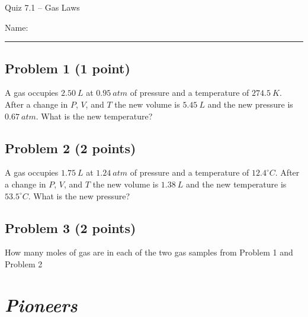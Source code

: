 \documentclass[11pt, letterpaper]{memoir}
\begin{document}
	\begin{center}
		{\large	Quiz 7.1 -- Gas Laws}
	\end{center}
{\large Name: \rule[-1mm]{4in}{.1pt}
	
	\subsection*{Problem 1 (1 point)}
	A gas occupies $2.50~L$ at $0.95~atm$ of pressure and a temperature of $274.5~K$. After a change in $P$, $V$, and $T$ the new volume is $5.45~L$ and the new pressure is $0.67~atm$. What is the new temperature?
	
	\vspace{10em}
	\subsection*{Problem 2 (2 points)}
	A gas occupies $1.75~L$ at $1.24~atm$ of pressure and a temperature of $12.4^\circ C$. After a change in $P$, $V$, and $T$ the new volume is $1.38~L$ and the new temperature is $53.5^\circ C$. What is the new pressure?
	
	\vspace{10em}
	\subsection*{Problem 3 (2 points)}
	How many moles of gas are in each of the two gas samples from Problem 1 and Problem 2 
\newpage
\pagestyle{empty}
\addtocounter{page}{-1}
\section*{\emph{Pioneers}}
}
\end{document}

